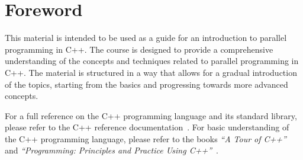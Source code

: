 \chapter*{Foreword}

This material is intended to be used as a guide for an introduction to parallel programming in C++. The course is designed to provide a comprehensive understanding of the concepts and techniques related to parallel programming in C++. The material is structured in a way that allows for a gradual introduction of the topics, starting from the basics and progressing towards more advanced concepts.

For a full reference on the C++ programming language and its standard library, please refer to the C++ reference documentation~\cite{cppreference}. For basic understanding of the C++ programming language, please refer to the books \emph{``A Tour of C++''}~\cite{stroustrup:2022} and \emph{``Programming: Principles and Practice Using C++''}~\cite{stroustrup:2024}.